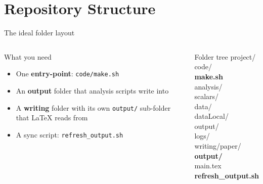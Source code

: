 \documentclass{beamer}
\newcommand{\code}[1]{\texttt{\small#1}}
\begin{document}
      





\section{Repository Structure}

\begin{frame}{The ideal folder layout}

\begin{columns}[T]
  \begin{block}{What you need}
    \begin{itemize}
      \item One \textbf{entry-point}: \code{code/make.sh}
      \item An \textbf{output} folder that analysis scripts write into
      \item A \textbf{writing} folder with its own \code{output/} sub-folder that LaTeX reads from
      \item A sync script: \code{refresh\_output.sh}
    \end{itemize}
  \end{block}

  \begin{exampleblock}{Folder tree}
    \ttfamily\scriptsize
    project/ \\
    \quad code/ \\
    \quad\quad \textbf{make.sh} \\
    \quad\quad analysis/ \\
    \quad\quad scalars/ \\
    \quad data/ \\
    \quad dataLocal/ \\
    \quad output/ \\
    \quad\quad logs/ \\
    \quad writing/paper/ \\
    \quad\quad \textbf{output/} \\
    \quad\quad main.tex \\
    \quad \textbf{refresh\_output.sh}
  \end{exampleblock}
\end{columns}

\end{frame}
\end{document}
